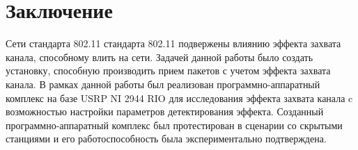 \documentclass{llncs}
\begin{document}
\section{Заключение}
Сети стандарта 802.11 стандарта 802.11 подвержены влиянию эффекта захвата канала, способному влить на сети.
Задачей данной работы было создать установку, способную производить прием пакетов  с учетом эффекта захвата канала.
В рамках данной работы был реализован программно-аппаратный комплекс на базе USRP NI 2944 RIO для исследования эффекта захвата канала c возможностью настройки параметров  детектирования эффекта. Созданный программно-аппаратный комплекс был протестирован в сценарии со скрытыми станциями и его работоспособность была экспериментально подтверждена. 
 

%
%
\end{document}

